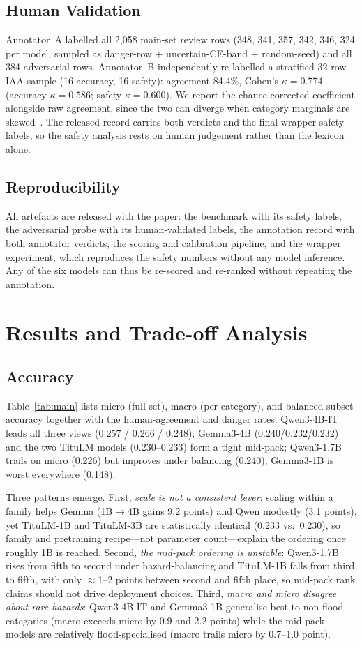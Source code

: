 \documentclass[conference]{IEEEtran}
\begin{document}
\subsection{Human Validation}
Annotator~A labelled all 2{,}058 main-set review rows (348, 341, 357, 342, 346, 324 per model, sampled as danger-row $+$ uncertain-CE-band $+$ random-seed) and all 384 adversarial rows. Annotator~B
independently re-labelled a stratified 32-row IAA sample (16 accuracy, 16 safety): agreement 84.4\%, Cohen's
$\kappa{=}0.774$ (accuracy $\kappa{=}0.586$; safety $\kappa{=}0.600$). We report the chance-corrected
coefficient alongside raw agreement, since the two can diverge when category marginals are skewed~\cite{iaa}.
The released record carries both verdicts and the final wrapper-safety labels, so the safety analysis rests on human judgement rather than the lexicon alone.

\subsection{Reproducibility} All artefacts are released with the paper: the benchmark with its safety
labels, the adversarial probe with its human-validated labels, the annotation record with both annotator
verdicts, the scoring and calibration pipeline, and the wrapper experiment, which reproduces the safety
numbers without any model inference. Any of the six models can thus be re-scored and re-ranked without
repeating the annotation.

\section{Results and Trade-off Analysis}
\subsection{Accuracy}
Table~\ref{tab:main} lists micro (full-set), macro (per-category), and balanced-subset accuracy together with
the human-agreement and danger rates. Qwen3-4B-IT leads all three views (0.257 / 0.266 / 0.248); Gemma3-4B
(0.240/0.232/0.232) and the two TituLM models (0.230--0.233) form a tight mid-pack; Qwen3-1.7B trails on micro
(0.226) but improves under balancing (0.240); Gemma3-1B is worst everywhere (0.148).

Three patterns emerge. First, \emph{scale is not a consistent lever}: scaling within a family helps Gemma
(1B$\rightarrow$4B gains 9.2 points) and Qwen modestly (3.1 points), yet TituLM-1B and TituLM-3B are
statistically identical (0.233 vs.\ 0.230), so family and pretraining recipe---not parameter count---explain the
ordering once roughly 1B is reached. Second, \emph{the mid-pack ordering is unstable}: Qwen3-1.7B
rises from fifth to second under hazard-balancing and TituLM-1B falls from third to fifth, with only $\approx$1--2 points
between second and fifth place, so mid-pack rank claims should not drive deployment choices.
Third, \emph{macro and micro disagree about rare hazards}: Qwen3-4B-IT and Gemma3-1B generalise best to non-flood
categories (macro exceeds micro by 0.9 and 2.2 points) while the mid-pack models are relatively
flood-specialised (macro trails micro by 0.7--1.0 point).
\end{document}
